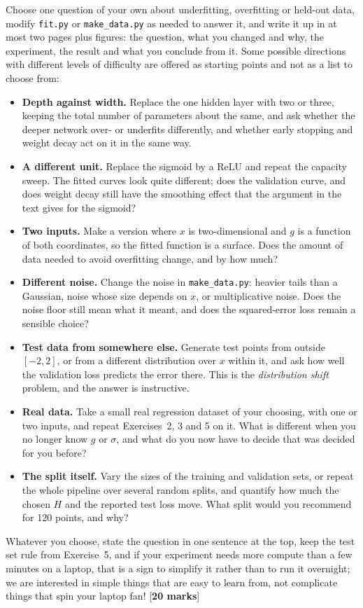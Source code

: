 \documentclass[11pt,a4paper]{article}
\newcounter{exercise}
\newenvironment{exercise}[1]{\refstepcounter{exercise}\begin{tcolorbox}[colback=blue!4,colframe=blue!50!black,title=Exercise \theexercise: #1,fonttitle=\bfseries]}{\end{tcolorbox}}
\newcommand{\mk}[1]{\hfill[\textbf{#1 marks}]}
\begin{document}
\begin{exercise}{your own investigation}
Choose one question of your own about underfitting, overfitting or held-out data, modify \texttt{fit.py} or \texttt{make\_data.py} as needed to answer it, and write it up in at most two pages plus figures: the question, what you changed and why, the experiment, the result and what you conclude from it. Some possible directions with different levels of difficulty are offered as starting points and not as a list to choose from:
\begin{itemize}[itemsep=0.2em]
\item \textbf{Depth against width.} Replace the one hidden layer with two or three, keeping the total number of parameters about the same, and ask whether the deeper network over- or underfits differently, and whether early stopping and weight decay act on it in the same way.
\item \textbf{A different unit.} Replace the sigmoid by a ReLU and repeat the capacity sweep. The fitted curves look quite different; does the validation curve, and does weight decay still have the smoothing effect that the argument in the text gives for the sigmoid?
\item \textbf{Two inputs.} Make a version where $x$ is two-dimensional and $g$ is a function of both coordinates, so the fitted function is a surface. Does the amount of data needed to avoid overfitting change, and by how much?
\item \textbf{Different noise.} Change the noise in \texttt{make\_data.py}: heavier tails than a Gaussian, noise whose size depends on $x$, or multiplicative noise. Does the noise floor still mean what it meant, and does the squared-error loss remain a sensible choice?
\item \textbf{Test data from somewhere else.} Generate test points from outside $[-2, 2]$, or from a different distribution over $x$ within it, and ask how well the validation loss predicts the error there. This is the \emph{distribution shift} problem, and the answer is instructive.
\item \textbf{Real data.} Take a small real regression dataset of your choosing, with one or two inputs, and repeat Exercises~2, 3 and 5 on it. What is different when you no longer know $g$ or $\sigma$, and what do you now have to decide that was decided for you before?
\item \textbf{The split itself.} Vary the sizes of the training and validation sets, or repeat the whole pipeline over several random splits, and quantify how much the chosen $H$ and the reported test loss move. What split would you recommend for 120 points, and why?
\end{itemize}
Whatever you choose, state the question in one sentence at the top, keep the test set rule from Exercise~5, and if your experiment needs more compute than a few minutes on a laptop, that is a sign to simplify it rather than to run it overnight; we are interested in simple things that are easy to learn from, not complicate things that spin your laptop fan!
\mk{20}
\end{exercise}
\end{document}
